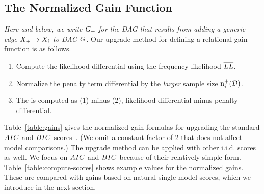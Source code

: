 \documentclass[letterpaper]{article}
\begin{document}
\subsection{The Normalized Gain Function} \label{sec:gain}
{\em Here and below, we write $G_{+}$ for the DAG that results from adding a generic edge $X_{+} \rightarrow X_{i}$ to DAG $G$.}
Our upgrade method for defining a relational gain function is as follows. 
\begin{enumerate}
\item Compute the likelihood differential using the frequency likelihood $\overline{LL}$.
\item  Normalize the penalty term differential by the {\em larger} sample size $\mathrm{n}^{+}_{i}(\mathcal{D})$. 
\item The  is computed as (1) minus (2), likelihood differential minus penalty differential. 
\end{enumerate}

Table~\ref{table:gains} gives the normalized gain formulas for upgrading the standard $AIC$ and $BIC$ scores~\cite{bouckaert95:_bayes}. (We omit a constant factor of 2 that does not affect model comparisons.) The upgrade method can be applied with other i.i.d. scores as well. We focus on $AIC$ and $BIC$ because of their relatively simple form. Table~\ref{table:compute-scores} shows 
example values for the normalized gains. These are compared with gains based on natural single model scores, which we introduce in the next section.
%

\end{document}

